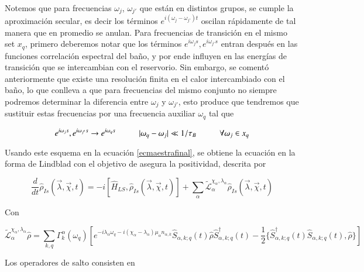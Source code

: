 Notemos que para frecuencias $\omega_{j}$, $\omega_{j'}$ que están en distintos grupos, se cumple la aproximación secular, es decir los términos $e^{i(\omega_{j} - \omega_{j'})t}$ oscilan rápidamente de tal manera que en promedio se anulan. Para frecuencias de transición en el mismo set $x_{q}$, primero deberemos notar que los términos $e^{i\omega_{j}s},e^{i\omega_{j'}s}$ entran después en las funciones correlación espectral del baño, y por ende influyen en las energías de transición que se intercambian con el reservorio. Sin embargo, se comentó anteriormente que existe una resolución finita en el calor intercambiado con el baño, lo que conlleva a que para frecuencias del mismo conjunto no siempre podremos determinar la diferencia entre $\omega_{j}$ y $\omega_{j'}$, esto produce que tendremos que sustituir estas frecuencias por una frecuencia auxiliar $\omega_{q}$ tal que

\begin{equation*}
    e^{i\omega_{j}s},e^{i\omega_{j'}s} \to e^{i\omega_{q}s} \hspace{10mm} |\omega_{q} - \omega_{j}| \ll 1/\tau_{B} \hspace{10mm} \forall \omega_{j} \in x_{q} 
\end{equation*}

Usando este esquema en la ecuación \ref{ecmaestrafinal}, se obtiene la ecuación en la forma de Lindblad con el objetivo de asegura la positividad\cite{chruscinski2017brief}, descrita por

\begin{equation*}
    \frac{d}{dt}\hat{\rho}_{Is}(\vec{\lambda},\vec{\chi},t) = -i[\hat{H}_{LS},\hat{\rho}_{Is}(\vec{\lambda},\vec{\chi},t)] + \sum_{\alpha}\tilde{\mathcal{L}}^{\chi_{\alpha},\lambda_{\alpha}}_{\alpha} \hat{\rho}_{Is}(\vec{\lambda},\vec{\chi},t)
\end{equation*}

Con

\begin{equation*}
    \tilde{\mathcal{L}}^{\chi_{\alpha},\lambda_{\alpha}}_{\alpha}\hat{\rho} = \sum_{k,q}\Gamma^{\alpha}_{k}(\omega_{q}) \left[e^{-i\lambda_{\alpha}\omega_{q} - i(\chi_{\alpha}-\lambda_{\alpha})\mu_{\alpha}n_{\alpha,k}}\hat{S}_{\alpha,k;q}(t)\hat{\rho}\hat{S}^{\dagger}_{\alpha,k;q}(t) - \frac{1}{2}\{\hat{S}^{\dagger}_{\alpha,k;q}(t)\hat{S}_{\alpha,k;q}(t),\hat{\rho} \} \right] 
\end{equation*}

Los operadores de salto consisten en

